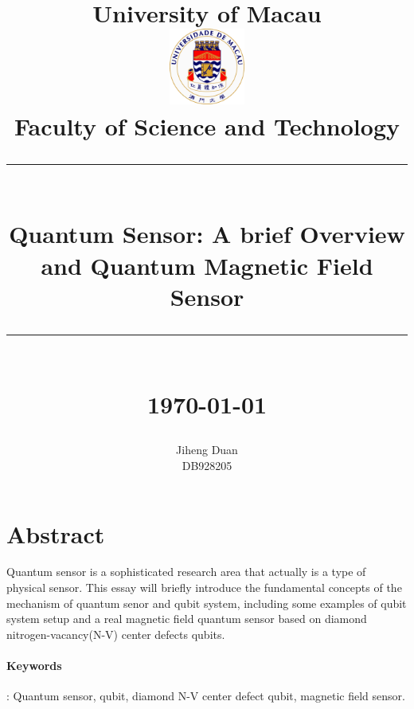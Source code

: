 \documentclass[11pt]{article}
\newcommand{\HRule}[1]{\rule{\linewidth}{#1}}
\begin{document}
\date{}

\title{ \normalsize University of Macau
		\\ [1.0cm]
		\includegraphics[width=25mm]{figures/1280px-University_of_Macau.svg.png}\\[.5cm]
		Faculty of Science and Technology\\
		\HRule{2pt} \\
		\LARGE \textbf{Quantum Sensor: A brief Overview and Quantum Magnetic Field Sensor} %
		\HRule{2pt} \\ [0.5cm]
		\normalsize \today \vspace*{5\baselineskip}}
		
\date{}

\author{
		Jiheng Duan  \\
		 DB928205}
		 
\maketitle

\newpage

\section*{Abstract}
Quantum sensor is a sophisticated research area that actually is a type of physical sensor. This essay will briefly introduce the fundamental concepts of the mechanism of quantum senor and qubit system, including some examples of qubit system setup and a real magnetic field quantum sensor based on diamond nitrogen-vacancy(N-V) center defects qubits. 

\paragraph*{Keywords}: Quantum sensor, qubit, diamond N-V center defect qubit, magnetic field sensor.
\end{document}
